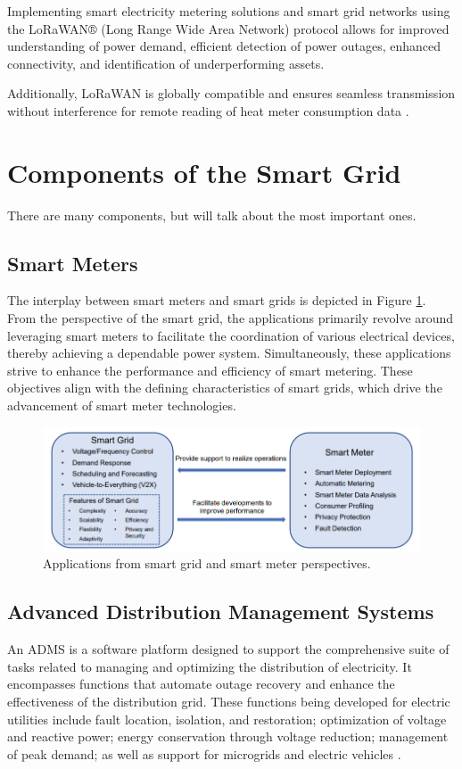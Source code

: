  Implementing smart electricity metering solutions and smart grid networks using the LoRaWAN® (Long Range Wide Area Network) protocol allows for improved understanding of power demand, efficient detection of power outages, enhanced connectivity, and identification of underperforming assets.
 
 Additionally, LoRaWAN is globally compatible and ensures seamless transmission without interference for remote reading of heat meter consumption data \cite{WhatIsSmartgrid}.
\section{Components of the Smart Grid }  
There are many components, but will talk about the most important ones.
\subsection{Smart Meters}
The interplay between smart meters and smart grids is depicted in Figure \ref{fig:SmartMeter}. From the perspective of the smart grid, the applications primarily revolve around leveraging smart meters to facilitate the coordination of various electrical devices, thereby achieving a dependable power system. Simultaneously, these applications strive to enhance the performance and efficiency of smart metering. These objectives align with the defining characteristics of smart grids, which drive the advancement of smart meter technologies.\cite{chen2023control}
\begin{figure}[h]
	\centering
	\includegraphics[width=\textwidth]{figures/SmartMeter.PNG}
	\caption{Applications from smart grid and smart meter perspectives. \cite{chen2023control}}
	\label{fig:SmartMeter}
\end{figure}
\newpage
\subsection{Advanced Distribution Management Systems }
An ADMS is a software platform designed to support the comprehensive suite of tasks related to managing and optimizing the distribution of electricity. It encompasses functions that automate outage recovery and enhance the effectiveness of the distribution grid. These functions being developed for electric utilities include fault location, isolation, and restoration; optimization of voltage and reactive power; energy conservation through voltage reduction; management of peak demand; as well as support for microgrids and electric vehicles \cite{avazov2016advanced}.

